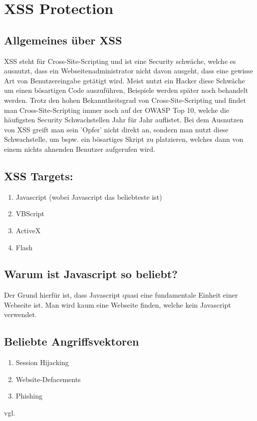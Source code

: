 \section{XSS Protection}
\label{sec:xss}
\subsection{Allgemeines über XSS}
\label{sec:xss_allgemein}
XSS steht für Cross-Site-Scripting und ist eine Security schwäche, welche es ausnutzt, dass ein Webseitenadministrator nicht davon ausgeht, dass eine gewisse Art von Benutzereingabe getätigt wird. Meist nutzt ein Hacker diese Schwäche um einen bösartigen Code auszuführen, Beispiele werden später noch behandelt werden. Trotz den hohen Bekanntheitsgrad von Cross-Site-Scripting und findet man Cross-Site-Scripting immer noch auf der OWASP Top 10, welche die häufigsten Security Schwachstellen Jahr für Jahr auflistet. Bei dem Ausnutzen von XSS greift man sein 'Opfer' nicht direkt an, sondern man nutzt diese Schwachstelle, um bspw. ein bösartiges Skript zu platzieren, welches dann von einem nichts ahnenden Benutzer aufgerufen wird. 
\subsection{XSS Targets:}
\label{sec:xss_targets}
\begin{enumerate}
\item Javascript (wobei Javascript das beliebteste ist) 
\item VBScript 
\item ActiveX
\item Flash
\end{enumerate}
\subsection{Warum ist Javascript so beliebt?}
\label{sec:xss_why}
Der Grund hierfür ist, dass Javascript quasi eine fundamentale Einheit einer Webseite ist. Man wird kaum eine Webseite finden, welche kein Javascript verwendet.
\subsection{Beliebte Angriffsvektoren}
\label{sec:xss_bel_agg}
\begin{enumerate}
\item Session Hijacking
\item Website-Defacements 
\item Phishing
\end{enumerate}
vgl. \textcite{XSS}
